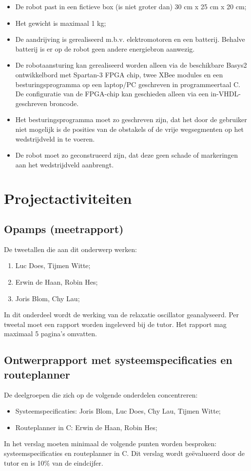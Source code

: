 \documentclass[11pt]{article}
\begin{document}
\begin{itemize}
\item De robot past in een ﬁctieve box (is niet groter dan) 30 cm x 25 cm x 20 cm;

\item Het gewicht is maximaal 1 kg;

\item De aandrijving is gerealiseerd m.b.v. elektromotoren en een batterij. Behalve
batterij is er op de robot geen andere energiebron aanwezig.

\item De robotaansturing kan gerealiseerd worden alleen via de beschikbare Basys2 ontwikkelbord met Spartan-3 FPGA chip, twee XBee modules en een besturingsprogramma op een laptop/PC geschreven in programmeertaal C. De conﬁguratie van
de FPGA-chip kan geschieden alleen via een in-VHDL-geschreven broncode.

\item Het besturingsprogramma moet zo geschreven zijn, dat het door de gebruiker niet
mogelijk is de posities van de obstakels of de vrije wegsegmenten op het wedstrijdveld in te voeren.

\item De robot moet zo geconstrueerd zijn, dat deze geen schade of markeringen aan het
wedstrijdveld aanbrengt.
\end{itemize}

\newpage
\section{Projectactiviteiten}
\subsection{Opamps (meetrapport)}
De tweetallen die aan dit onderwerp werken:
\begin{enumerate}
\item Luc Does, Tijmen Witte;
\item Erwin de Haan, Robin Hes;
\item Joris Blom, Chy Lau;
\end{enumerate}
In dit onderdeel wordt de werking van de relaxatie oscillator geanalyseerd. Per tweetal moet een rapport worden ingeleverd bij de tutor. Het rapport mag maximaal 5 pagina's omvatten. 

\subsection{Ontwerprapport met systeemspecificaties en routeplanner}
De deelgroepen die zich op de volgende onderdelen concentreren:
\begin{itemize}
\item Systeemspecificaties: Joris Blom, Luc Does, Chy Lau, Tijmen Witte;
\item Routeplanner in C: Erwin de Haan, Robin Hes;
\end{itemize}
In het verslag moeten minimaal de volgende punten worden besproken: systeemspecificaties en routeplanner in C. Dit verslag wordt geëvalueerd door de tutor en is 10\% van de eindcijfer.
\end{document}
